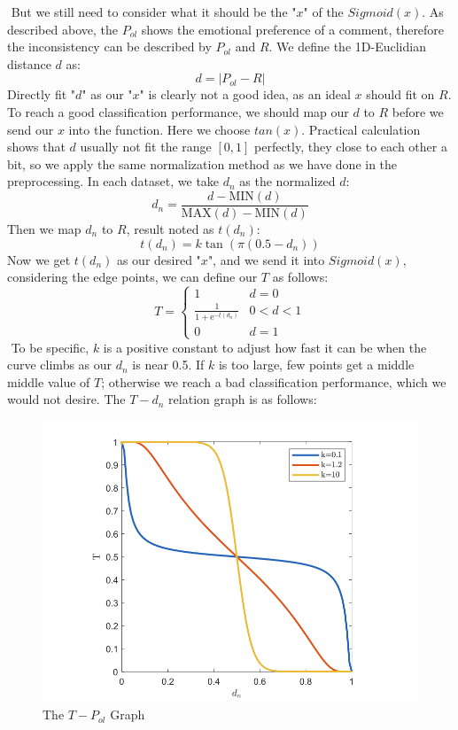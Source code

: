 \documentclass[12pt]{article}  %
\begin{document}
​		But we still need to consider what it should be the "$x$" of the $Sigmoid(x)$. As described above, the $P_{ol}$ shows the emotional preference of a comment, therefore the inconsistency can be described by $P_{ol}$ and $R$. We define the 1D-Euclidian distance $d$ as:
$$
d = \vert P_{ol} - R\vert
$$
​		Directly fit "$d$" as our "$x$" is clearly not a good idea, as an ideal $x$ should fit on $R$. To reach a good classification performance, we should map our $d$ to $R$ before we send our $x$ into the function. Here we choose $tan(x)$. Practical calculation shows that $d$ usually not fit the range $[0,1]$ perfectly, they close to each other a bit, so we apply the same normalization method as we have done in the preprocessing. In each dataset, we take $d_{n}$ as the normalized $d$:
$$
d_{n} = \frac{d - \mathrm{MIN}(d)}{\mathrm{MAX}(d) - \mathrm{MIN}(d)}
$$
​		Then we map $d_{n}$ to $R$, result noted as $t(d_{n})$:
$$
t(d_{n}) =k \tan(\pi  (0.5-d_{n}))
$$
​		Now we get $t(d_{n})$ as our desired "$x$", and we send it into $Sigmoid(x)$, considering the edge points, we can define our $T$ as follows:
$$
{T} = \left\{\begin{matrix}
1 &d=0\\ 
\frac{1}{1+\mathrm{e}^{-t(d_{n})}} & 0<d<1\\ 
0 & d=1
\end{matrix}\right.
$$
​		To be specific, $k$ is a positive constant to adjust how fast it can be when the curve climbs as our $d_{n}$ is near 0.5. If $k$ is too large, few points get a middle middle value of $T$; otherwise we reach a bad classification performance, which we would not desire. The $T-d_{n}$ relation graph is as follows:

\begin{figure}[H]
  \centering
  \includegraphics[width=0.7\linewidth]{Q1picture/Q1dnT.png}
  \caption{The $T - P_{ol}$ Graph}
  \label{fig:}
\end{figure}
\end{document}

